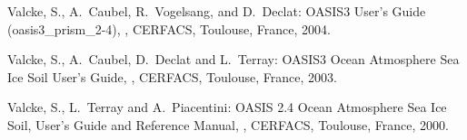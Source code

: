 \begin{thebibliography}{10}
Valcke, S., A.~Caubel, R.~Vogelsang, and D.~Declat:       
\newblock OASIS3 User's Guide (oasis3\_prism\_2-4),
, 
\newblock CERFACS, Toulouse, France, 2004.

Valcke, S., A.~Caubel, D.~Declat and L.~Terray:        
\newblock OASIS3 Ocean Atmosphere Sea Ice Soil User's Guide,
, 
\newblock CERFACS, Toulouse, France, 2003.

Valcke, S., L.~Terray and A.~Piacentini:
\newblock OASIS 2.4 Ocean Atmosphere Sea Ice Soil, User's Guide and
Reference Manual,
, 
\newblock CERFACS, Toulouse, France, 2000.

\end{thebibliography}
